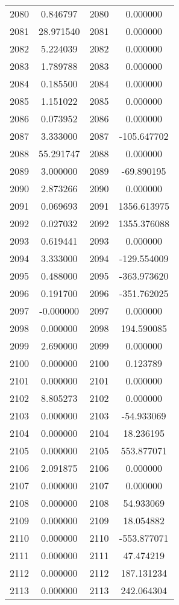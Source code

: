 \documentclass[12pt]{article}
\begin{document}
\begin{longtable}{@{}cccc@{}}
2080 & 0.846797 & 2080 & 0.000000 \\
2081 & 28.971540 & 2081 & 0.000000 \\
2082 & 5.224039 & 2082 & 0.000000 \\
2083 & 1.789788 & 2083 & 0.000000 \\
2084 & 0.185500 & 2084 & 0.000000 \\
2085 & 1.151022 & 2085 & 0.000000 \\
2086 & 0.073952 & 2086 & 0.000000 \\
2087 & 3.333000 & 2087 & -105.647702 \\
2088 & 55.291747 & 2088 & 0.000000 \\
2089 & 3.000000 & 2089 & -69.890195 \\
2090 & 2.873266 & 2090 & 0.000000 \\
2091 & 0.069693 & 2091 & 1356.613975 \\
2092 & 0.027032 & 2092 & 1355.376088 \\
2093 & 0.619441 & 2093 & 0.000000 \\
2094 & 3.333000 & 2094 & -129.554009 \\
2095 & 0.488000 & 2095 & -363.973620 \\
2096 & 0.191700 & 2096 & -351.762025 \\
2097 & -0.000000 & 2097 & 0.000000 \\
2098 & 0.000000 & 2098 & 194.590085 \\
2099 & 2.690000 & 2099 & 0.000000 \\
2100 & 0.000000 & 2100 & 0.123789 \\
2101 & 0.000000 & 2101 & 0.000000 \\
2102 & 8.805273 & 2102 & 0.000000 \\
2103 & 0.000000 & 2103 & -54.933069 \\
2104 & 0.000000 & 2104 & 18.236195 \\
2105 & 0.000000 & 2105 & 553.877071 \\
2106 & 2.091875 & 2106 & 0.000000 \\
2107 & 0.000000 & 2107 & 0.000000 \\
2108 & 0.000000 & 2108 & 54.933069 \\
2109 & 0.000000 & 2109 & 18.054882 \\
2110 & 0.000000 & 2110 & -553.877071 \\
2111 & 0.000000 & 2111 & 47.474219 \\
2112 & 0.000000 & 2112 & 187.131234 \\
2113 & 0.000000 & 2113 & 242.064304 \\

\end{longtable}
\end{document}
